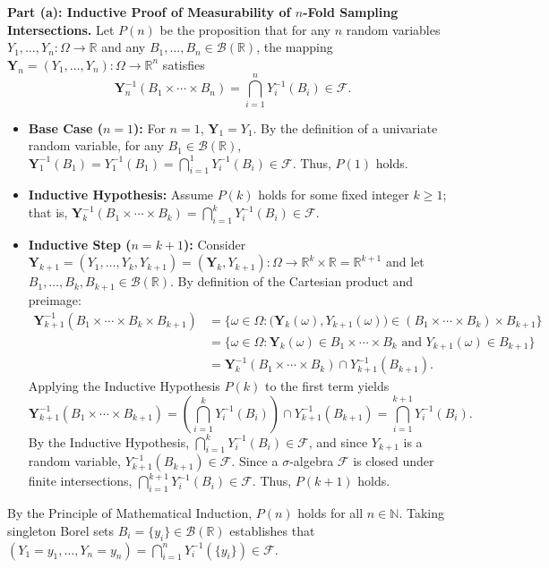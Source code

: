\documentclass[11pt, letterpaper]{article}
\theoremstyle{definition}
\theoremstyle{remark}
\newcommand{\R}{\mathbb{R}}
\newcommand{\N}{\mathbb{N}}
\newcommand{\F}{\mathcal{F}}
\begin{document}
\textbf{Part (a): Inductive Proof of Measurability of $n$-Fold Sampling Intersections.}
Let $P(n)$ be the proposition that for any $n$ random variables $Y_1, \dots, Y_n : \Omega \to \R$ and any $B_1, \dots, B_n \in \mathcal{B}(\R)$, the mapping $\mathbf{Y}_n = (Y_1, \dots, Y_n) : \Omega \to \R^n$ satisfies
\[
\mathbf{Y}_n^{-1}(B_1 \times \cdots \times B_n) = \bigcap_{i=1}^{n} Y_i^{-1}(B_i) \in \F.
\]
\begin{itemize}
    \item \textbf{Base Case ($n = 1$):} For $n = 1$, $\mathbf{Y}_1 = Y_1$. By the definition of a univariate random variable, for any $B_1 \in \mathcal{B}(\R)$, $\mathbf{Y}_1^{-1}(B_1) = Y_1^{-1}(B_1) = \bigcap_{i=1}^1 Y_i^{-1}(B_i) \in \F$. Thus, $P(1)$ holds.
    \item \textbf{Inductive Hypothesis:} Assume $P(k)$ holds for some fixed integer $k \ge 1$; that is, $\mathbf{Y}_k^{-1}(B_1 \times \cdots \times B_k) = \bigcap_{i=1}^{k} Y_i^{-1}(B_i) \in \F$.
    \item \textbf{Inductive Step ($n = k + 1$):} Consider $\mathbf{Y}_{k+1} = (Y_1, \dots, Y_k, Y_{k+1}) = (\mathbf{Y}_k, Y_{k+1}) : \Omega \to \R^k \times \R = \R^{k+1}$ and let $B_1, \dots, B_k, B_{k+1} \in \mathcal{B}(\R)$. By definition of the Cartesian product and preimage:
    \begin{align*}
    \mathbf{Y}_{k+1}^{-1}(B_1 \times \cdots \times B_k \times B_{k+1}) &= \bigl\{\omega \in \Omega : \bigl(\mathbf{Y}_k(\omega), Y_{k+1}(\omega)\bigr) \in (B_1 \times \cdots \times B_k) \times B_{k+1}\bigr\} \\
    &= \bigl\{\omega \in \Omega : \mathbf{Y}_k(\omega) \in B_1 \times \cdots \times B_k \text{ and } Y_{k+1}(\omega) \in B_{k+1}\bigr\} \\
    &= \mathbf{Y}_k^{-1}(B_1 \times \cdots \times B_k) \cap Y_{k+1}^{-1}(B_{k+1}).
    \end{align*}
    Applying the Inductive Hypothesis $P(k)$ to the first term yields
    \[
    \mathbf{Y}_{k+1}^{-1}(B_1 \times \cdots \times B_{k+1}) = \left(\bigcap_{i=1}^{k} Y_i^{-1}(B_i)\right) \cap Y_{k+1}^{-1}(B_{k+1}) = \bigcap_{i=1}^{k+1} Y_i^{-1}(B_i).
    \]
    By the Inductive Hypothesis, $\bigcap_{i=1}^k Y_i^{-1}(B_i) \in \F$, and since $Y_{k+1}$ is a random variable, $Y_{k+1}^{-1}(B_{k+1}) \in \F$. Since a $\sigma$-algebra $\F$ is closed under finite intersections, $\bigcap_{i=1}^{k+1} Y_i^{-1}(B_i) \in \F$. Thus, $P(k+1)$ holds.
\end{itemize}
By the Principle of Mathematical Induction, $P(n)$ holds for all $n \in \N$. Taking singleton Borel sets $B_i = \{y_i\} \in \mathcal{B}(\R)$ establishes that $(Y_1 = y_1, \dots, Y_n = y_n) = \bigcap_{i=1}^n Y_i^{-1}(\{y_i\}) \in \F$.
\end{document}
